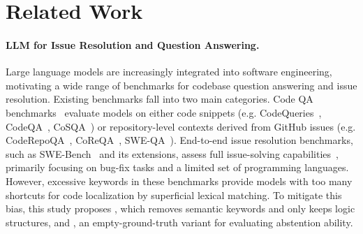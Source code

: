 \section{Related Work}\label{sec:related-dataloc}
\paragraph{LLM for Issue Resolution and Question Answering.}
Large language models are increasingly integrated into software engineering, motivating a wide range of benchmarks for codebase question answering and issue resolution. Existing benchmarks fall into two main categories. Code QA benchmarks~\cite{strich2024improving,li2024infibench,li2024procqa} evaluate models on either code snippets (e.g. CodeQueries~\cite{sahu2024codequeries}, CodeQA~\cite{liu2021codeqa}, CoSQA~\cite{huang2021cosqa}) or repository-level contexts derived from GitHub issues (e.g. CodeRepoQA~\cite{hu2024coderepoqa}, CoReQA~\cite{chen2025coreqa}, SWE-QA~\cite{peng2025swe}). End-to-end issue resolution benchmarks, such as SWE-Bench~\cite{jimenez2024swebench} and its extensions, assess full issue-solving capabilities~\cite{jimenez2024swebench,chen-etal-2025-locagent,zhuo2024bigcodebench,deng2025nocode,niu2023crosscodebench,chen2021evaluating,ouyang2024benchmarking,gao2023benchmarking,jiang2024collubenchbenchmarkpredictinglanguage,jain2024r2e,mundler2024swt,xie2024osworld,yang2025swesmith}, primarily focusing on bug-fix tasks and a limited set of programming languages. However, excessive keywords in these benchmarks provide models with too many shortcuts for code localization by superficial lexical matching. To mitigate this bias, this study proposes \dataset, which removes semantic keywords and only keeps logic structures, and \negset, an empty-ground-truth variant for evaluating abstention ability.

